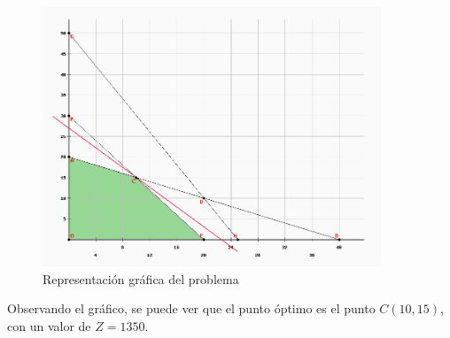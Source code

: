 \documentclass[../main.tex]{subfiles}
\begin{document}
\begin{exercise}
\begin{enumerate}
\begin{figure}[ht]
                        \includegraphics[width=0.9\textwidth]{./images/guia/1-2_ejercicio.png}
                        \caption{Representación gráfica del problema}
                    \end{figure}

                    Observando el gráfico, se puede ver que el punto óptimo es el punto $C(10,15)$, con un valor de $Z = 1350$.

                    \newpage
                    

\end{enumerate}
\end{exercise}
\end{document}
